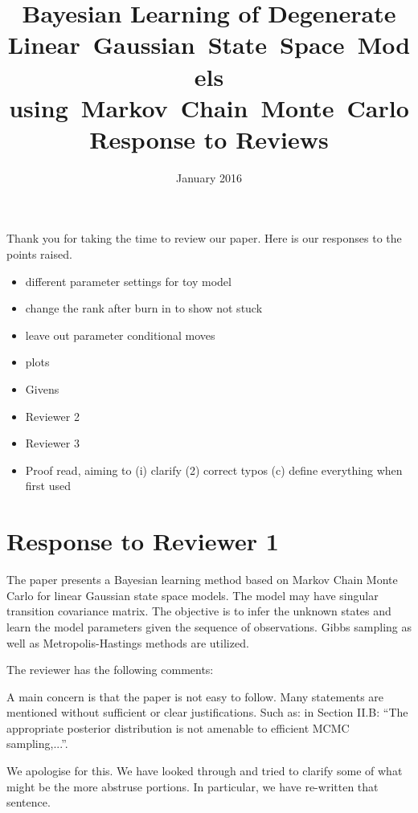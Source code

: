 \documentclass{article}
\title{Bayesian Learning of Degenerate Linear~Gaussian~State~Space~Models using~Markov~Chain~Monte~Carlo \\ Response to Reviews}
\date{January 2016}
\newenvironment{review}[0]{\begin{itshape}\color{Gray}\noindent}{\end{itshape}\vspace{0.4cm}}
\newenvironment{response}[0]{\noindent}{\vspace{0.4cm}}
\newcommand{\meta}[1]{{\color{red}\em #1}}
\begin{document}
\maketitle

Thank you for taking the time to review our paper. Here is our responses to the points raised.

\meta{
\begin{itemize}
 \item different parameter settings for toy model
 \item change the rank after burn in to show not stuck
 \item leave out parameter conditional moves
 \item plots
 \item Givens
 \item Reviewer 2
 \item Reviewer 3
 \item Proof read, aiming to (i) clarify (2) correct typos (c) define everything when first used
\end{itemize}

}

\section*{Response to Reviewer 1}

\begin{review}
The paper presents a Bayesian learning method based on Markov Chain Monte Carlo for linear Gaussian state space models. The model may have singular transition covariance matrix. The objective is to infer the unknown states and learn the model parameters given the sequence of observations. Gibbs sampling as well as Metropolis-Hastings methods are utilized.

The reviewer has the following comments:

A main concern is that the paper is not easy to follow. Many statements are mentioned without sufficient or clear justifications. Such as: in Section II.B: ``The appropriate posterior distribution is not amenable to efficient MCMC sampling,...''.
\end{review}

\begin{response}
 We apologise for this. We have looked through and tried to clarify some of what might be the more abstruse portions. In particular, we have re-written that sentence.
\end{response}
\end{document}
